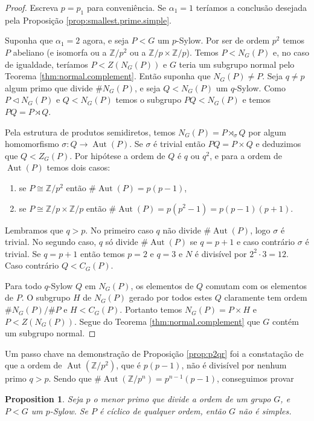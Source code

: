 \documentclass[12pt]{article}
\theoremstyle{plain}
\newtheorem{prop}[thm]{Proposition}
\theoremstyle{definition}
\newcommand{\Z}{\mathbb{Z}}
\newcommand{\al}{\alpha}
\newcommand{\ns}{\vartriangleleft}
\DeclareMathOperator{\Aut}{Aut}
\begin{document}
\begin{proof}
Escreva $p = p_1$ para conveniência. Se $\al_1 = 1$ teríamos a conclusão desejada pela Proposição \ref{prop:smallest.prime.simple}.

Suponha que $\al_1 = 2$ agora, e seja $P < G$ um $p$-Sylow. Por ser de ordem $p^2$ temos $P$ abeliano (e isomorfa ou a $\Z/p^2$ ou a $\Z/p \times \Z/p$). Temos $P < N_G(P)$ e, no caso de igualdade, teríamos $P < Z(N_G(P))$ e $G$ teria um subgrupo normal pelo Teorema \ref{thm:normal.complement}. Então suponha que $N_G(P) \neq P$. Seja $q \neq p$ algum primo que divide $\# N_G(P)$, e seja $Q < N_G(P)$ um $q$-Sylow. Como $P \ns N_G(P)$ e $Q < N_G(P)$ temos o subgrupo $PQ < N_G(P)$ e temos $PQ = P \rtimes Q$.

Pela estrutura de produtos semidiretos, temos $N_G(P) = P \rtimes_\sigma Q$ por algum homomorfismo $\sigma : Q \rightarrow \Aut(P)$. Se $\sigma$ é trivial então $PQ = P \times Q$ e deduzimos que $Q < Z_G(P)$. Por hipótese a ordem de $Q$ é $q$ ou $q^2$, e para a ordem de $\Aut(P)$ temos dois casos:
\begin{enumerate}
\item se $P \cong \Z/p^2$ então $\# \Aut(P) = p(p-1)$,

\item se $P \cong \Z/p \times \Z/p$ então $\# \Aut(P) = p(p^2-1) = p(p-1)(p+1)$.
\end{enumerate}
Lembramos que $q > p$. No primeiro caso $q$ não divide $\# \Aut(P)$, logo $\sigma$ é trivial. No segundo caso, $q$ só divide $\# \Aut(P)$ se $q = p+1$ e caso contrário $\sigma$ é trivial. Se $q = p+1$ então temos $p=2$ e $q=3$ e $N$ é divisível por $2^2 \cdot 3 = 12$. Caso contrário $Q < C_G(P)$.

Para todo $q$-Sylow $Q$ em $N_G(P)$, os elementos de $Q$ comutam com os elementos de $P$. O subgrupo $H$ de $N_G(P)$ gerado por todos estes $Q$ claramente tem ordem $\#N_G(P) / \#P$ e $H < C_G(P)$. Portanto temos $N_G(P) = P \times H$ e $P < Z(N_G(P))$. Segue do Teorema \ref{thm:normal.complement} que $G$ contém um subgrupo normal.
\end{proof}


Um passo chave na demonstração de Proposição \ref{prop:p2qr} foi a constatação de que a ordem de $\Aut(\Z/p^2)$, que é $p(p-1)$, não é divisível por nenhum primo $q > p$. Sendo que $\# \Aut(\Z/p^n) = p^{n-1}(p-1)$, conseguimos provar
\begin{prop}
Seja $p$ o menor primo que divide a ordem de um grupo $G$, e $P < G$ um $p$-Sylow. Se $P$ é cíclico de qualquer ordem, então $G$ não é simples.
\end{prop}




{}

\end{document}
